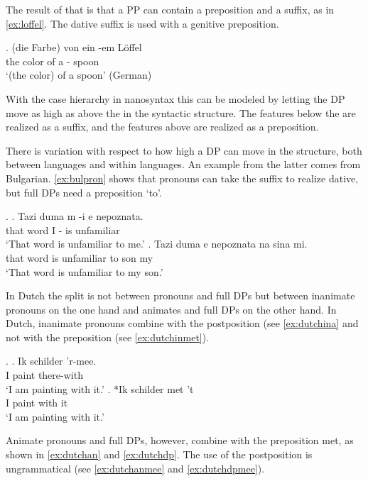 \documentclass[12pt]{article}
\begin{document}
The result of that is that a PP can contain a preposition and a suffix, as in \ref{ex:loffel}. The dative suffix is used with a genitive preposition.

\exg. (die Farbe) von ein -em Löffel\\
the color of a - spoon\\
`(the color) of a spoon' \hfill (German)\label{ex:loffel}

With the case hierarchy in nanosyntax this can be modeled by letting the DP move as high as above the  in the syntactic structure. The features below the  are realized as a suffix, and the features above  are realized as a preposition.

There is variation with respect to how high a DP can move in the structure, both between languages and within languages. An example from the latter comes from Bulgarian. \ref{ex:bulpron} shows that pronouns can take the suffix  to realize dative, but full DPs need a preposition  `to'.

\ex.\label{ex:bulgarian}
\ag. Tazi duma m -i e nepoznata.\\
that word I - is unfamiliar\\
`That word is unfamiliar to me.'\label{ex:bulpron}
\bg. Tazi duma e nepoznata na sina mi.\\
that word is unfamiliar to son my\\
`That word is unfamiliar to my son.'\label{ex:buldpto} \hfill \citep[39]{caha2009}

In Dutch the split is not between pronouns and full DPs but between inanimate pronouns on the one hand and animates and full DPs on the other hand. In Dutch, inanimate pronouns combine with the postposition  (see \ref{ex:dutchina} and not with the preposition  (see \ref{ex:dutchinmet}).

\ex.
\ag. Ik schilder 'r-mee.\\
 I paint there-with\\
 `I am painting with it.'\label{ex:dutchina}
\bg. *Ik schilder met 't\\
 I paint with it\\
 `I am painting with it.'\label{ex:dutchinmet}

Animate pronouns and full DPs, however, combine with the preposition met, as shown in \ref{ex:dutchan} and \ref{ex:dutchdp}. The use of the postposition  is ungrammatical (see \ref{ex:dutchanmee} and \ref{ex:dutchdpmee}).
\end{document}
